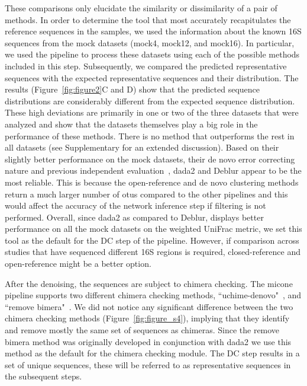   These comparisons only elucidate the similarity or dissimilarity of a pair of methods.
  In order to determine the tool that most accurately recapitulates the reference sequences in the samples, we used the information about the known 16S sequences from the mock datasets (mock4, mock12, and mock16).
  In particular, we used the pipeline to process these datasets using each of the possible methods included in this step.
  Subsequently, we compared the predicted representative sequences with the expected representative sequences and their distribution.
  The results (Figure~\ref{fig:figure2}C and D) show that the predicted sequence distributions are considerably different from the expected sequence distribution.
  These high deviations are primarily in one or two of the three datasets that were analyzed and show that the datasets themselves play a big role in the performance of these methods.
  There is no method that outperforms the rest in all datasets (see Supplementary for an extended discussion).
  Based on their slightly better performance on the mock datasets, their de novo error correcting nature and previous independent evaluation~\cite{Nearing2018}, \ac{dada2} and Deblur appear to be the most reliable.
  This is because the open-reference and de novo clustering methods return a much larger number of \ac{otu}s compared to the other pipelines and this would affect the accuracy of the network inference step if filtering is not performed.
  Overall, since \ac{dada2} as compared to Deblur, displays better performance on all the mock datasets on the weighted UniFrac metric, we set this tool as the default for the DC step of the pipeline.
  However, if comparison across studies that have sequenced different 16S regions is required, closed-reference and open-reference might be a better option.

  After the denoising, the sequences are subject to chimera checking.
  The \ac{micone} pipeline supports two different chimera checking methods, ``uchime-denovo"~\cite{bolyenReproducibleInteractiveScalable2019}, and ``remove bimera"~\cite{Callahan2016}.
  We did not notice any significant difference between the two chimera checking methods (Figure~\ref{fig:figure_s4}), implying that they identify and remove mostly the same set of sequences as chimeras.
  Since the remove bimera method was originally developed in conjunction with dada2 we use this method as the default for the chimera checking module.
  The DC step results in a set of unique sequences, these will be referred to as representative sequences in the subsequent steps.

